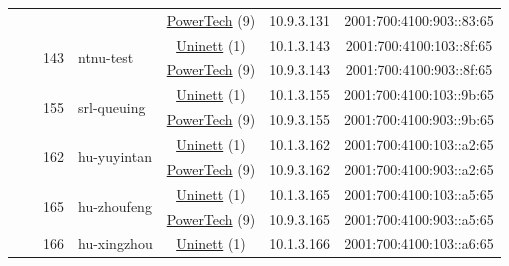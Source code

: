 \begin{small}
\begin{center}
\begin{longtable}{|c|c|c|c|c|c|c|c|}
  &  &  &  & \multicolumn{2}{|c|}{\tiny{\href{http://www.powertech.no}{PowerTech} (9)}} & \tiny{10.9.3.131} & \tiny{2001:700:4100:903::83:65} \\* \cline{3-3}\cline{4-4}\cline{5-5}\cline{6-6}\cline{7-7}\cline{8-8}
  &  & \multirow{2}{*}{\tiny{143}} & \multicolumn{1}{|l|}{\multirow{2}{*}{\tiny{ntnu-test}}} & \multicolumn{2}{|c|}{\tiny{\href{https://www.uninett.no}{Uninett} (1)}} & \tiny{10.1.3.143} & \tiny{2001:700:4100:103::8f:65} \\* \cline{5-5}\cline{6-6}\cline{7-7}\cline{8-8}
  &  &  &  & \multicolumn{2}{|c|}{\tiny{\href{http://www.powertech.no}{PowerTech} (9)}} & \tiny{10.9.3.143} & \tiny{2001:700:4100:903::8f:65} \\* \cline{3-3}\cline{4-4}\cline{5-5}\cline{6-6}\cline{7-7}\cline{8-8}
  &  & \multirow{2}{*}{\tiny{155}} & \multicolumn{1}{|l|}{\multirow{2}{*}{\tiny{srl-queuing}}} & \multicolumn{2}{|c|}{\tiny{\href{https://www.uninett.no}{Uninett} (1)}} & \tiny{10.1.3.155} & \tiny{2001:700:4100:103::9b:65} \\* \cline{5-5}\cline{6-6}\cline{7-7}\cline{8-8}
  &  &  &  & \multicolumn{2}{|c|}{\tiny{\href{http://www.powertech.no}{PowerTech} (9)}} & \tiny{10.9.3.155} & \tiny{2001:700:4100:903::9b:65} \\* \cline{3-3}\cline{4-4}\cline{5-5}\cline{6-6}\cline{7-7}\cline{8-8}
  &  & \multirow{2}{*}{\tiny{162}} & \multicolumn{1}{|l|}{\multirow{2}{*}{\tiny{hu-yuyintan}}} & \multicolumn{2}{|c|}{\tiny{\href{https://www.uninett.no}{Uninett} (1)}} & \tiny{10.1.3.162} & \tiny{2001:700:4100:103::a2:65} \\* \cline{5-5}\cline{6-6}\cline{7-7}\cline{8-8}
  &  &  &  & \multicolumn{2}{|c|}{\tiny{\href{http://www.powertech.no}{PowerTech} (9)}} & \tiny{10.9.3.162} & \tiny{2001:700:4100:903::a2:65} \\* \cline{3-3}\cline{4-4}\cline{5-5}\cline{6-6}\cline{7-7}\cline{8-8}
  &  & \multirow{2}{*}{\tiny{165}} & \multicolumn{1}{|l|}{\multirow{2}{*}{\tiny{hu-zhoufeng}}} & \multicolumn{2}{|c|}{\tiny{\href{https://www.uninett.no}{Uninett} (1)}} & \tiny{10.1.3.165} & \tiny{2001:700:4100:103::a5:65} \\* \cline{5-5}\cline{6-6}\cline{7-7}\cline{8-8}
  &  &  &  & \multicolumn{2}{|c|}{\tiny{\href{http://www.powertech.no}{PowerTech} (9)}} & \tiny{10.9.3.165} & \tiny{2001:700:4100:903::a5:65} \\* \cline{3-3}\cline{4-4}\cline{5-5}\cline{6-6}\cline{7-7}\cline{8-8}
  &  & \multirow{2}{*}{\tiny{166}} & \multicolumn{1}{|l|}{\multirow{2}{*}{\tiny{hu-xingzhou}}} & \multicolumn{2}{|c|}{\tiny{\href{https://www.uninett.no}{Uninett} (1)}} & \tiny{10.1.3.166} & \tiny{2001:700:4100:103::a6:65} \\* \cline{5-5}\cline{6-6}\cline{7-7}\cline{8-8}

\end{longtable}
\end{center}
\end{small}

